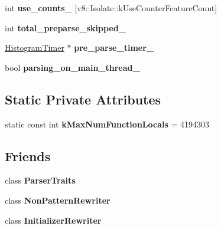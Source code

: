 \begin{DoxyCompactItemize}
\item 
int {\bfseries use\+\_\+counts\+\_\+} \mbox{[}v8\+::\+Isolate\+::k\+Use\+Counter\+Feature\+Count\mbox{]}\hypertarget{classv8_1_1internal_1_1_parser_a1c96c5d51e8f5e5a68cff2711845174d}{}\label{classv8_1_1internal_1_1_parser_a1c96c5d51e8f5e5a68cff2711845174d}

\item 
int {\bfseries total\+\_\+preparse\+\_\+skipped\+\_\+}\hypertarget{classv8_1_1internal_1_1_parser_aef9572a33956fea2a83b5cd17e973a65}{}\label{classv8_1_1internal_1_1_parser_aef9572a33956fea2a83b5cd17e973a65}

\item 
\hyperlink{classv8_1_1internal_1_1_histogram_timer}{Histogram\+Timer} $\ast$ {\bfseries pre\+\_\+parse\+\_\+timer\+\_\+}\hypertarget{classv8_1_1internal_1_1_parser_ac5d0c46e3e25903f105fad1849c1340d}{}\label{classv8_1_1internal_1_1_parser_ac5d0c46e3e25903f105fad1849c1340d}

\item 
bool {\bfseries parsing\+\_\+on\+\_\+main\+\_\+thread\+\_\+}\hypertarget{classv8_1_1internal_1_1_parser_a241c0dcf4ef789e0e0f00a59e1565458}{}\label{classv8_1_1internal_1_1_parser_a241c0dcf4ef789e0e0f00a59e1565458}

\end{DoxyCompactItemize}
\subsection*{Static Private Attributes}
\begin{DoxyCompactItemize}
\item 
static const int {\bfseries k\+Max\+Num\+Function\+Locals} = 4194303\hypertarget{classv8_1_1internal_1_1_parser_ae042607fd907096db6bb74ce0ec3302b}{}\label{classv8_1_1internal_1_1_parser_ae042607fd907096db6bb74ce0ec3302b}

\end{DoxyCompactItemize}
\subsection*{Friends}
\begin{DoxyCompactItemize}
\item 
class {\bfseries Parser\+Traits}\hypertarget{classv8_1_1internal_1_1_parser_a5f14c645eff20b2a5bad62347cde341c}{}\label{classv8_1_1internal_1_1_parser_a5f14c645eff20b2a5bad62347cde341c}

\item 
class {\bfseries Non\+Pattern\+Rewriter}\hypertarget{classv8_1_1internal_1_1_parser_af3cdac3b5f41bcb4f9987424fbb9aceb}{}\label{classv8_1_1internal_1_1_parser_af3cdac3b5f41bcb4f9987424fbb9aceb}

\item 
class {\bfseries Initializer\+Rewriter}\hypertarget{classv8_1_1internal_1_1_parser_aa0cd6e888d222bf4b9d65b67a8011e59}{}\label{classv8_1_1internal_1_1_parser_aa0cd6e888d222bf4b9d65b67a8011e59}

\end{DoxyCompactItemize}

